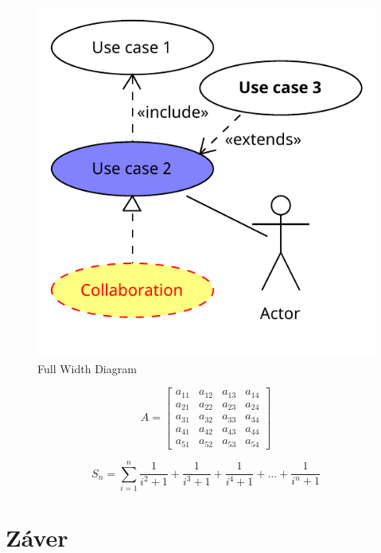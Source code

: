 \documentclass[10pt,twocolumn,twoside,slovak,a4paper]{article}
\begin{document}
\begin{figure}[htbp]
    \centering
    \includegraphics[width=\textwidth]{Diagrams/Diagram.pdf}
    \caption{Full Width Diagram}
    \label{fig:full_width_diagram}
\end{figure}

\begin{equation}
    A = \begin{bmatrix}
        a_{11} & a_{12} & a_{13} & a_{14} \\
        a_{21} & a_{22} & a_{23} & a_{24} \\
        a_{31} & a_{32} & a_{33} & a_{34} \\
        a_{41} & a_{42} & a_{43} & a_{44} \\
        a_{51} & a_{52} & a_{53} & a_{54}
    \end{bmatrix}
\end{equation}

\begin{equation}
    S_n = \sum_{i=1}^{n} \frac{1}{i^2 + 1} + \frac{1}{i^3 + 1} + \frac{1}{i^4 + 1} + \ldots + \frac{1}{i^n + 1}
\end{equation}

\section{Záver} \label{zaver} %







\end{document}
